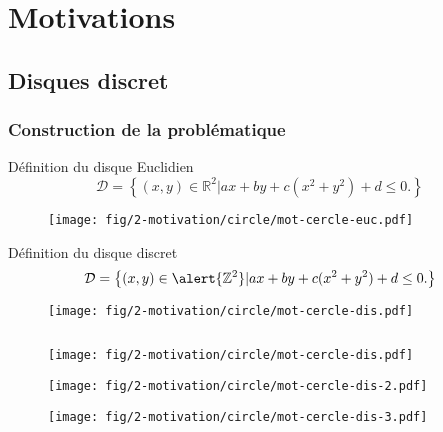 \section{Motivations}

\subsection{Disques discret}

\begin{frame}
\frametitle{Construction de la problématique}
  {
    \begin{block}{Définition du disque Euclidien}
      $$\mathcal{D} =  \left\{ (x,y) \in \mathbb{R}^{2} |  ax + by + c(x^2 + y^2) + d \leq 0. \right\}$$
    \end{block}
    
    \begin{figure}[h!]
      \centering
      \texttt{[image: fig/2-motivation/circle/mot-cercle-euc.pdf]}
    \end{figure}
        
  }
  {
    \begin{block}{Définition du disque discret}
      $$\mathcal{D} =  \left\{ (x,y) \in \alert{\mathbb{Z}^{2}} |  ax + by + c(x^2 + y^2) + d \leq 0. \right\}$$
    \end{block}
  }
  {  
    \begin{figure}[h!]
      \centering
      \texttt{[image: fig/2-motivation/circle/mot-cercle-dis.pdf]}
    \end{figure}
  }
  
  \begin{columns}[t]
    \begin{column}{6cm}
      {
        \begin{figure}[h!]
          \centering
          \texttt{[image: fig/2-motivation/circle/mot-cercle-dis.pdf]}
        \end{figure}
      }
      {
        \begin{figure}[h!]
          \centering
          \texttt{[image: fig/2-motivation/circle/mot-cercle-dis-2.pdf]}
        \end{figure}
      }
      {
        \begin{figure}[h!]
          \centering
          \texttt{[image: fig/2-motivation/circle/mot-cercle-dis-3.pdf]}
        \end{figure}
      }          
      \end{column}
      \begin{column}{5cm}
        \vspace{-0.4cm}
        

\end{column}
\end{columns}
\end{frame}
